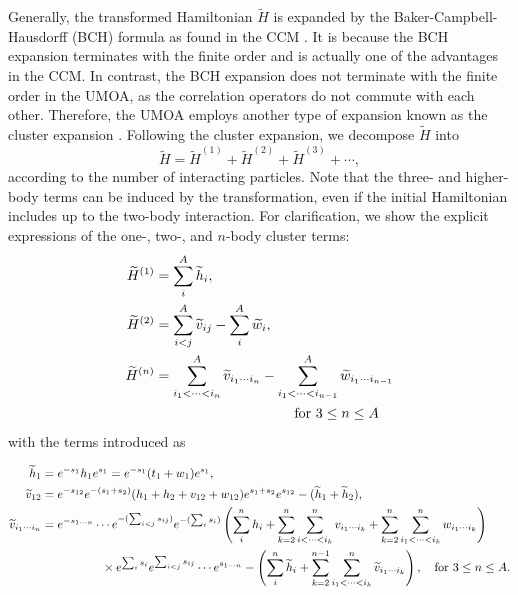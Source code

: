 \documentclass[aps,prc, dvips, twocolumn,groupedaddress,showkeys,showpacs,floatfix,superscriptaddress]{revtex4-1}
\newcommand{\<}{\langle}
\renewcommand{\>}{\rangle}
\begin{document}
Generally, the transformed Hamiltonian $\widetilde{H}$ is expanded by the
 Baker-Campbell-Hausdorff (BCH) formula as found in the CCM \cite{Hagen:2014}.
It is because the BCH expansion terminates with the finite order and
 is actually one of the advantages in the CCM.
In contrast, the BCH expansion does not terminate with
 the finite order in the UMOA, as the correlation operators
 do not commute with each other.
Therefore, the UMOA employs another type of expansion known as the
 cluster expansion \cite{Providencia:1964}.
Following the cluster expansion, we decompose $\widetilde{H}$ into
\begin{equation}
  \label{cl_ex}
 \widetilde{H}=\widetilde{H}^{(1)}+\widetilde{H}^{(2)} +
  \widetilde{H}^{(3)} + \cdots,
\end{equation}
according to the number of interacting particles.
Note that the three- and higher-body terms can be induced by the
transformation, even if the initial Hamiltonian includes up to
the two-body interaction.
For clarification, we show the explicit expressions of the
one-, two-, and $n$-body cluster terms:
\begin{align}
\label{1b_h}
 \widetilde{H}^{(1)} &= \sum_{i}^{A}\widetilde{h}_{i},\\
\label{2b_h}
\widetilde{H}^{(2)} &=  \sum_{i<j}^{A}\widetilde{v}_{ij} - \sum_{i}^{A}\widetilde{w}_{i},\\
\label{nb_h}
\widetilde{H}^{(n)} &=\sum_{i_{1}<\cdots <i_{n}}^{A}
 \widetilde{v}_{i_{1}\cdots i_{n}}- \sum_{i_{1}<\cdots <
 i_{n-1}}^{A}\widetilde{w}_{i_{1}\cdots i_{n-1}} \\
 & \hspace{10em} \text{for } 3 \le n \le A \notag
\end{align}
with the terms introduced as
\begin{widetext}
\begin{align}
\label{1b_int}
 \widetilde{h}_{1}&= e^{-s_{1}}h_{1}e^{s_{1}}=
 e^{-s_{1}}( t_{1}+w_{1})e^{s_{1}}, \\
\label{2b_int}
\widetilde{v}_{12}&= e^{-s_{12}}e^{-(s_{1}+s_{2})} (h_{1}+h_{2}+v_{12}+w_{12})
 e^{s_{1}+s_{2}}e^{s_{12}}- (\widetilde{h}_{1}+\widetilde{h}_{2}), \\
\label{nb_int}
 \widetilde{v}_{i_{1}\cdots i_{n}} &= e^{-s_{1\cdots n}} \cdots
 e^{-(\sum_{i<j}s_{ij})}e^{-(\sum_{i}s_{i})}
 \left(\sum_{i}^{n}h_{i}+\sum_{k=2}^{n}\sum_{i<\cdots
 <i_{k}}^{n}v_{i_{1}\cdots i_{k}}+
\sum_{k =2}^{n}\sum_{i_{1}<\cdots< i_{k}}^{n}w_{i_{1}\cdots i_{k}}\right)
 \notag \\
&\hspace{5em}\times
   e^{\sum_{i}s_{i}} e^{\sum_{i<j}s_{ij}} \cdots e^{s_{1 \cdots n}}
-\left(\sum_{i}^{n}\widetilde{h}_{i}+\sum_{k=2}^{n-1}\sum_{i_{1}<\cdots <i_{k} }^{n}
 \widetilde{v}_{i_{1}\cdots i_{k}}\right), \quad \text{for } 3 \le n \le A.
\end{align}
\end{widetext}
\end{document}
